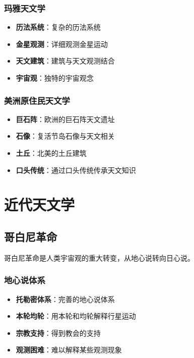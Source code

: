 \documentclass[12pt,UTF8]{ctexbook}
\begin{document}
\subsection{玛雅天文学}

\begin{itemize}
  \item \textbf{历法系统}：复杂的历法系统
  \item \textbf{金星观测}：详细观测金星运动
  \item \textbf{天文建筑}：建筑与天文观测结合
  \item \textbf{宇宙观}：独特的宇宙观念
\end{itemize}

\subsection{美洲原住民天文学}

\begin{itemize}
  \item \textbf{巨石阵}：欧洲的巨石阵天文遗址
  \item \textbf{石像}：复活节岛石像与天文相关
  \item \textbf{土丘}：北美的土丘建筑
  \item \textbf{口头传统}：通过口头传统传承天文知识
\end{itemize}

\chapter{近代天文学}
\section{哥白尼革命}

哥白尼革命是人类宇宙观的重大转变，从地心说转向日心说。

\subsection{地心说体系}

\begin{itemize}
  \item \textbf{托勒密体系}：完善的地心说体系
  \item \textbf{本轮均轮}：用本轮和均轮解释行星运动
  \item \textbf{宗教支持}：得到教会的支持
  \item \textbf{观测困难}：难以解释某些观测现象
\end{itemize}
\end{document}
